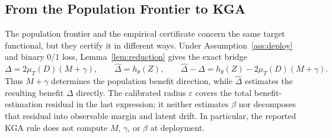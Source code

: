 
\subsection{From the Population Frontier to KGA}
\label{sec:theory-algorithm-bridge}

The population frontier and the empirical certificate concern the same target
functional, but they certify it in different ways. Under
Assumption~\ref{ass:deploy} and binary $0/1$ loss,
Lemma~\ref{lem:reduction} gives the exact bridge
\begin{equation}
  \Delta
  = 2\mu_T(D)(M+\gamma),
  \qquad
  \widehat\Delta=h_\theta(Z),
  \qquad
  \widehat\Delta-\Delta
  =h_\theta(Z)-2\mu_T(D)(M+\gamma).
  \label{eq:population-empirical-bridge}
\end{equation}
Thus $M+\gamma$ determines the population benefit direction, while
$\widehat\Delta$ estimates the resulting benefit $\Delta$ directly.  The
calibrated radius $\varepsilon$ covers the total benefit-estimation residual in
the last expression; it neither estimates $\beta$ nor decomposes that residual
into observable margin and latent drift.  In particular, the reported KGA rule
does not compute $M$, $\gamma$, or $\beta$ at deployment.

